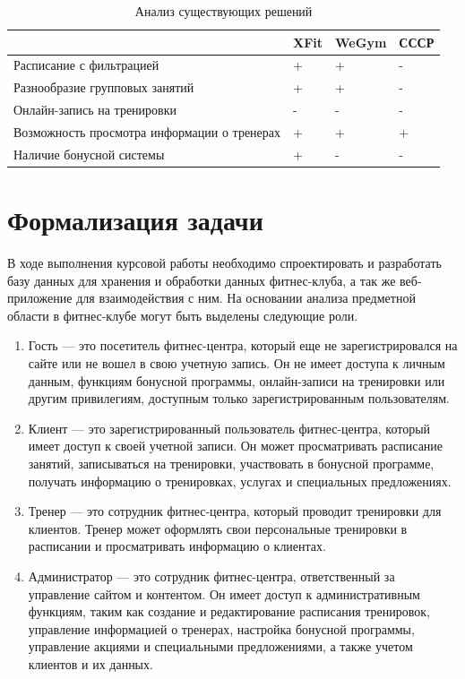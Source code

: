 \begin{table}[h]
	\begin{center}
		\begin{threeparttable}
			\captionsetup{justification=raggedright,singlelinecheck=off}
			\caption{\label{tbl:solve} Анализ существующих решений}
			\begin{tabular}{|p{6cm}|p{3cm}|p{3cm}|p{3cm}|}
				\hline  & XFit & WeGym  & СССР \\ \hline
				Расписание с фильтрацией & + & + & -  \\ \hline
				Разнообразие групповых занятий & + & + & -  \\ \hline
				Онлайн-запись на тренировки & -  & - & - \\ \hline
				Возможность просмотра информации о тренерах & + & + & + \\ \hline
				Наличие бонусной системы & + & - & - \\ \hline
			\end{tabular}
		\end{threeparttable}
	\end{center}
\end{table}

\section{Формализация задачи}\label{sec:формализация}

В ходе выполнения курсовой работы необходимо спроектировать и разработать базу данных для хранения и обработки данных фитнес-клуба, а так же веб-приложение для взаимодействия с ним.
На основании анализа предметной области в фитнес-клубе могут быть выделены следующие роли.
\begin{enumerate}[label=\arabic*)]
	\item Гость --- это посетитель фитнес-центра, который еще не зарегистрировался на сайте или не вошел в свою учетную запись. Он не имеет доступа к личным данным, функциям бонусной программы, онлайн-записи на тренировки или другим привилегиям, доступным только зарегистрированным пользователям.
	\item Клиент --- это зарегистрированный пользователь фитнес-центра, который имеет доступ к своей учетной записи. Он может просматривать расписание занятий, записываться на тренировки, участвовать в бонусной программе, получать информацию о тренировках, услугах и специальных предложениях.
	\item Тренер --- это сотрудник фитнес-центра, который проводит тренировки для клиентов. Тренер может оформлять свои персональные тренировки в расписании и просматривать информацию о клиентах.
	\item Администратор --- это сотрудник фитнес-центра, ответственный за управление сайтом и контентом. Он имеет доступ к административным функциям, таким как создание и редактирование расписания тренировок, управление информацией о тренерах, настройка бонусной программы, управление акциями и специальными предложениями, а также учетом клиентов и их данных.
\end{enumerate}

